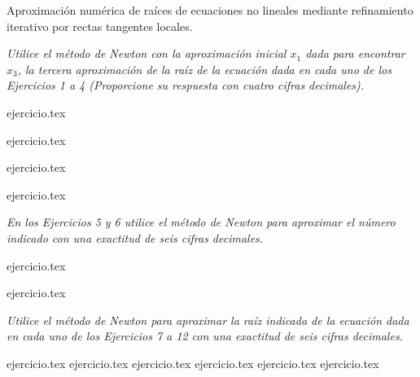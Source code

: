 
Aproximación numérica de raíces de ecuaciones no lineales mediante refinamiento iterativo por rectas tangentes locales.

\noindent \textit{Utilice el método de Newton con la aproximación inicial $x_1$ dada para encontrar $x_3$, la tercera aproximación de la raíz de la ecuación dada en cada uno de los Ejercicios 1 a 4 (Proporcione su respuesta con cuatro cifras decimales).}

\begin{enumerate}
    \begin{minipage}{0.45\textwidth}
    {ejercicio.tex}
    \addtocounter{enumi}{1}
    {ejercicio.tex}
    \end{minipage}%
    \begin{minipage}{0.45\textwidth}
    \setcounter{enumi}{1}
    {ejercicio.tex}
    \addtocounter{enumi}{1}
    {ejercicio.tex}
    \end{minipage}
\end{enumerate}

\noindent \textit{En los Ejercicios 5 y 6 utilice el método de Newton para aproximar el número indicado con una exactitud de seis cifras decimales.}

\begin{enumerate}
    \begin{minipage}{0.45\textwidth}
    \setcounter{enumi}{4}
    {ejercicio.tex}
    \end{minipage}%
    \begin{minipage}{0.45\textwidth}
    \setcounter{enumi}{5}
    {ejercicio.tex}
    \end{minipage}
\end{enumerate}

\noindent \textit{Utilice el método de Newton para aproximar la raíz indicada de la ecuación dada en cada uno de los Ejercicios 7 a 12 con una exactitud de seis cifras decimales.}

\begin{enumerate}
    \setcounter{enumi}{6}
    {ejercicio.tex}
    {ejercicio.tex}
    {ejercicio.tex}
    {ejercicio.tex}
    {ejercicio.tex}
    {ejercicio.tex}
\end{enumerate}

